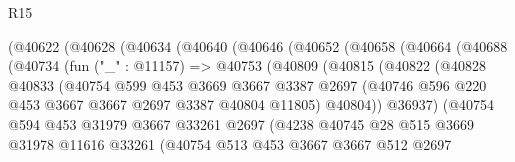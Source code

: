 \begin{lexlean}{R15}
\begin{coremodule}
            (@40622
              (@40628
                (@40634
                  (@40640
                    (@40646
                      (@40652
                        (@40658
                          (@40664
                            (@40688
                              (@40734
                                (fun ("_" : @11157) =>
                                @40753
                                  (@40809
                                    (@40815
                                      (@40822
                                        (@40828
                                          @40833
                                          (@40754
                                            @599
                                            @453
                                            @3669
                                            @3667
                                            @3387
                                            @2697
                                            (@40746
                                              @596
                                              @220
                                              @453
                                              @3667
                                              @3667
                                              @2697
                                              @3387
                                              @40804
                                              @11805)
                                            @40804))
                                        @36937)
                                      (@40754
                                        @594
                                        @453
                                        @31979
                                        @3667
                                        @33261
                                        @2697
                                        (@4238
                                          @40745
                                          @28
                                          @515
                                          @3669
                                          @31978
                                          @11616
                                          @33261
                                          (@40754
                                            @513
                                            @453
                                            @3667
                                            @3667
                                            @512
                                            @2697

\end{coremodule}
\end{lexlean}
